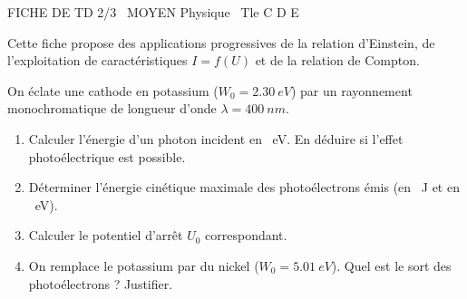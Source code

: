 \documentclass[11pt]{article}
\begin{document}
\begin{tcolorbox}[enhanced,colback=popink,colframe=popink,arc=10pt,boxrule=0pt,left=12pt,right=12pt,top=9pt,bottom=9pt]
{\color{white}\popxbold\small FICHE DE TD 2/3 \textbullet\ MOYEN \hfill Physique \textbullet\ Tle C D E\par}
\end{tcolorbox}
\vspace{4pt}
Cette fiche propose des applications progressives de la relation d'Einstein, de l'exploitation de caractéristiques $I=f(U)$ et de la relation de Compton.

\begin{exercice}
On éclate une cathode en potassium ($W_0 = \SI{2,30}{eV}$) par un rayonnement monochromatique de longueur d'onde $\lambda = \SI{400}{nm}$.
\begin{enumerate}
    \item Calculer l'énergie d'un photon incident en \SI{}{eV}. En déduire si l'effet photoélectrique est possible.
    \item Déterminer l'énergie cinétique maximale des photoélectrons émis (en \SI{}{J} et en \SI{}{eV}).
    \item Calculer le potentiel d'arrêt $U_0$ correspondant.
    \item On remplace le potassium par du nickel ($W_0 = \SI{5,01}{eV}$). Quel est le sort des photoélectrons ? Justifier.
\end{enumerate}
\end{exercice}
\end{document}
